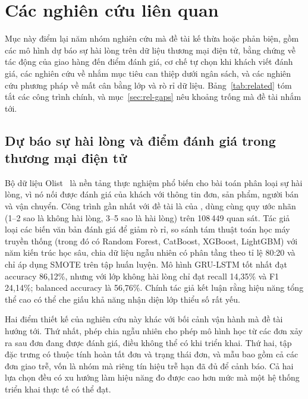 \section{Các nghiên cứu liên quan}\label{sec:related}

Mục này điểm lại năm nhóm nghiên cứu mà đề tài kế thừa hoặc phản biện, gồm các mô hình dự báo sự hài lòng trên dữ liệu thương mại điện tử, bằng chứng về tác động của giao hàng đến điểm đánh giá, cơ chế tự chọn khi khách viết đánh giá, các nghiên cứu về nhắm mục tiêu can thiệp dưới ngân sách, và các nghiên cứu phương pháp về mất cân bằng lớp và rò rỉ dữ liệu. Bảng~\ref{tab:related} tóm tắt các công trình chính, và mục~\ref{sec:rel-gaps} nêu khoảng trống mà đề tài nhắm tới.

\subsection{Dự báo sự hài lòng và điểm đánh giá trong thương mại điện tử}\label{sec:rel-satisfaction}

Bộ dữ liệu Olist~\parencite{olist2018} là nền tảng thực nghiệm phổ biến cho bài toán phân loại sự hài lòng, vì nó nối được đánh giá của khách với thông tin đơn, sản phẩm, người bán và vận chuyển. Công trình gần nhất với đề tài là của \textcite{orman2026}, dùng cùng quy ước nhãn (1--2 sao là không hài lòng, 3--5 sao là hài lòng) trên 108\,449 quan sát. Tác giả loại các biến văn bản đánh giá để giảm rò rỉ, so sánh tám thuật toán học máy truyền thống (trong đó có Random Forest, CatBoost, XGBoost, LightGBM) với năm kiến trúc học sâu, chia dữ liệu ngẫu nhiên có phân tầng theo tỉ lệ 80:20 và chỉ áp dụng SMOTE trên tập huấn luyện. Mô hình GRU-LSTM tốt nhất đạt accuracy 86,12\%, nhưng với lớp không hài lòng chỉ đạt recall 14,35\% và F1 24,14\%; balanced accuracy là 56,76\%. Chính tác giả kết luận rằng hiệu năng tổng thể cao có thể che giấu khả năng nhận diện lớp thiểu số rất yếu.

Hai điểm thiết kế của nghiên cứu này khác với bối cảnh vận hành mà đề tài hướng tới. Thứ nhất, phép chia ngẫu nhiên cho phép mô hình học từ các đơn xảy ra sau đơn đang được đánh giá, điều không thể có khi triển khai. Thứ hai, tập đặc trưng có thuộc tính hoàn tất đơn và trạng thái đơn, và mẫu bao gồm cả các đơn giao trễ, vốn là nhóm mà riêng tín hiệu trễ hạn đã đủ để cảnh báo. Cả hai lựa chọn đều có xu hướng làm hiệu năng đo được cao hơn mức mà một hệ thống triển khai thực tế có thể đạt.

